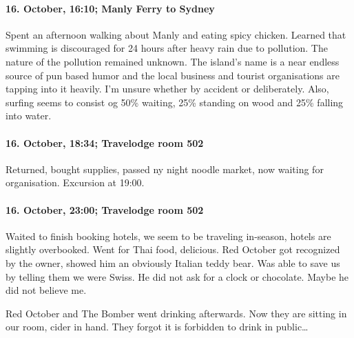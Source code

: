 \paragraph{16. October, 16:10; Manly Ferry to Sydney}
Spent an afternoon walking about Manly and eating spicy chicken.
Learned that swimming is discouraged for 24 hours after heavy rain due to pollution.
The nature of the pollution remained unknown.
The island's name is a near endless source of pun based humor and the local business and tourist organisations are tapping into it heavily.
I'm unsure whether by accident or deliberately.
Also, surfing seems to consist og 50\% waiting, 25\% standing on wood and 25\% falling into water.

\paragraph{16. October, 18:34; Travelodge room 502}
Returned, bought supplies, passed ny night noodle market, now waiting for organisation.
Excursion at 19:00.

\paragraph{16. October, 23:00; Travelodge room 502}
Waited to finish booking hotels, we seem to be traveling in-season, hotels are slightly overbooked.
Went for Thai food, delicious.
Red October got recognized by the owner, showed him an obviously Italian teddy bear.
Was able to save us by telling them we were Swiss.
He did not ask for a clock or chocolate.
Maybe he did not believe me.

Red October and The Bomber went drinking afterwards.
Now they are sitting in our room, cider in hand.
They forgot it is forbidden to drink in public\ldots{}